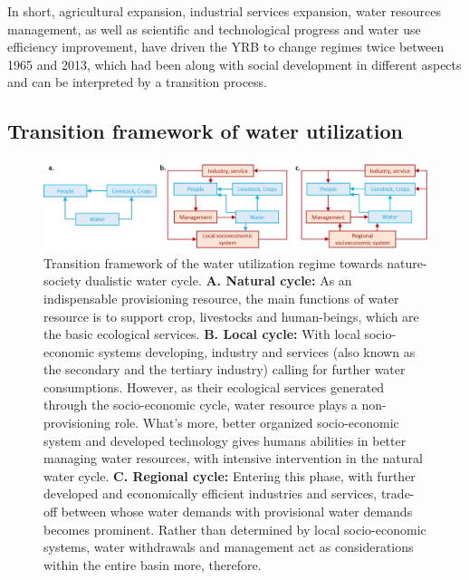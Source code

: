 \documentclass[9pt, twocolumn, twoside, lineno]{pnas-new}
\begin{document}
In short, agricultural expansion, industrial services expansion, water resources management, as well as scientific and technological progress and water use efficiency improvement, have driven the YRB to change regimes twice between 1965 and 2013, which had been along with social development in different aspects and can be interpreted by a transition process.

\subsection*{Transition framework of water utilization}

\begin{figure}[thbp]
	\centering
	\includegraphics[width=\linewidth]{../../figures/main/transition.jpg}
	\caption{
		Transition framework of the water utilization regime towards nature-society dualistic water cycle.
		\textbf{A. Natural cycle:} As an indispensable provisioning resource, the main functions of water resource is to support crop, livestocks and human-beings, which are the basic ecological services.
		\textbf{B. Local cycle:} With local socio-economic systems developing, industry and services (also known as the secondary and the tertiary industry) calling for further water consumptions.
		However, as their ecological services generated through the socio-economic cycle, water resource plays a non-provisioning role. What's more, better organized socio-economic system and developed technology gives humans abilities in better managing water resources, with intensive intervention in the natural water cycle. 
		\textbf{C. Regional cycle:} Entering this phase, with further developed and economically efficient industries and services, trade-off between whose water demands with provisional water demands becomes prominent. Rather than determined by local socio-economic systems, water withdrawals and management act as considerations within the entire basin more, therefore. 
	}
	\label{fig:summary}
\end{figure}
\end{document}

